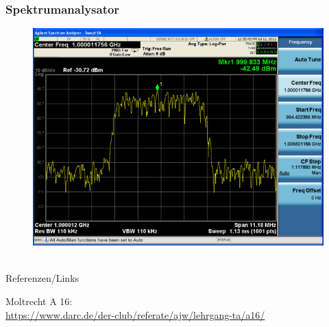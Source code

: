 \begin{frame}
  \frametitle{Spektrumanalysator}
  \begin{center}
    \begin{figure}
      \includegraphics[width=\textwidth,height=.75\textheight,keepaspectratio]{a16/Spektrumanalysator-Display.png}
    \end{figure}
  \end{center}
\end{frame}

\renewcommand{\refname}{Referenzen}

\hypertarget{refs}{}
\textcolor{white}{} \\ %
\Large Referenzen/Links
\footnotesize

\begin{thebibliography}{}
    Moltrecht A 16: \\
    \url{https://www.darc.de/der-club/referate/ajw/lehrgang-ta/a16/}

\end{thebibliography}


